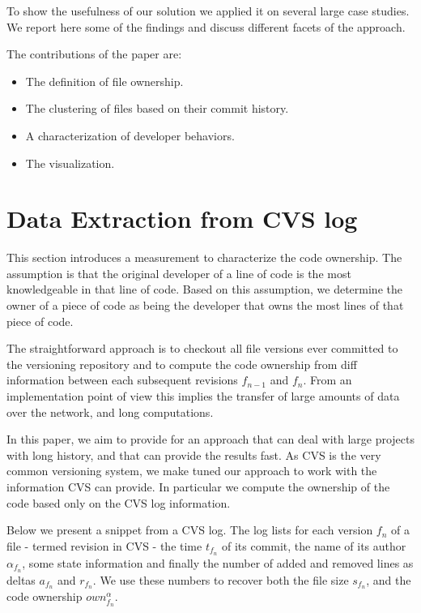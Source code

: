 \documentclass[10pt]{book}
\begin{document}
To show the usefulness of our solution we applied it on several large case studies. We report here some of the findings and discuss different facets of the approach.

The contributions of the paper are:
\begin{itemize}
\item The definition of file ownership.
\item The clustering of files based on their commit history.
\item A characterization of developer behaviors.
\item The \omap visualization.
\end{itemize}

\section{Data Extraction from CVS log}\label{sec:ownership}

This section introduces a measurement to characterize the code ownership. The assumption is that the original developer of a line of code is the most knowledgeable in that line of code. Based on this assumption, we determine the owner of a piece of code as being the developer that owns the most lines  of that piece of code.

The straightforward approach is to checkout all file versions ever committed to the versioning repository and to compute the code ownership from diff information between each subsequent revisions $f_{n-1}$ and $f_n$. From an implementation point of view this implies the transfer of large amounts of data over the network, and long computations.

In this paper, we aim to provide for an approach that can deal with large projects with long history, and that can provide the results fast. As CVS is the very common versioning system, we make tuned our approach to work with the information CVS can provide. In particular we compute the ownership of the code based only on the CVS log information.

Below we present a snippet from a CVS log. The log lists for each version $f_n$ of a file \-- termed revision in CVS \-- the time $t_{f_n}$ of its commit, the name of its author $\alpha_{f_n}$, some state information and finally the number of added and removed lines as deltas $a_{f_n}$ and $r_{f_n}$. We use these numbers to recover both the file size $s_{f_n}$, and the code ownership $own_{f_n}^\alpha$.
\end{document}
